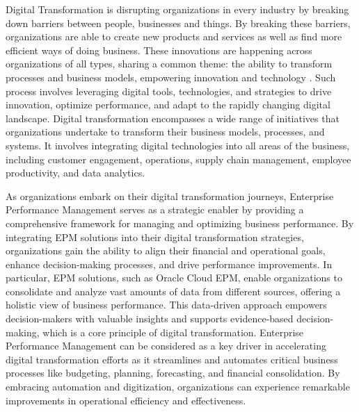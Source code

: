 \documentclass[12pt,a4paper,openright,twoside]{book}
\begin{document}
Digital Transformation is disrupting organizations in every industry by breaking down barriers between people, businesses and things.
%
By breaking these barriers, organizations are able to create new products and services as well as find more efficient ways of doing business. 
%
These innovations are happening across organizations of all types, sharing a common theme: the ability to transform processes and business models, empowering innovation and technology \cite{schwertner2017digital}.
%
Such process involves leveraging digital tools, technologies, and strategies to drive innovation, optimize performance, and adapt to the rapidly changing digital landscape.
%
Digital transformation encompasses a wide range of initiatives that organizations undertake to transform their business models, processes, and systems. 
%
It involves integrating digital technologies into all areas of the business, including customer engagement, operations, supply chain management, employee productivity, and data analytics.

As organizations embark on their digital transformation journeys, Enterprise Performance Management serves as a strategic enabler by providing a comprehensive framework for managing and optimizing business performance. 
%
By integrating EPM solutions into their digital transformation strategies, organizations gain the ability to align their financial and operational goals, enhance decision-making processes, and drive performance improvements.
%
In particular, EPM solutions, such as Oracle Cloud EPM, enable organizations to consolidate and analyze vast amounts of data from different sources, offering a holistic view of business performance. 
%
This data-driven approach empowers decision-makers with valuable insights and supports evidence-based decision-making, which is a core principle of digital transformation. 
%
Enterprise Performance Management can be considered as a key driver in accelerating digital transformation efforts as it streamlines and automates critical business processes like budgeting, planning, forecasting, and financial consolidation. 
%
By embracing automation and digitization, organizations can experience remarkable improvements in operational efficiency and effectiveness.
\end{document}
